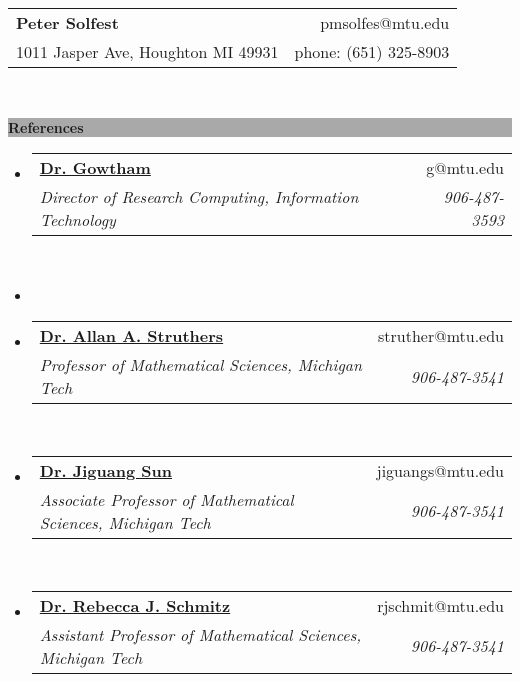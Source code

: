 \documentclass[letterpaper,11pt]{article}
\makeatletter
\newcommand{\resheading}[1]{{\large \colorbox{darkGrey}{\color{white}\begin{minipage}{\textwidth}{\textbf{#1 \vphantom{p\^{E}}}}\end{minipage}}}}
\newcommand{\ressubheading}[4]{
\begin{tabular*}{6.5in}{l@{\extracolsep{\fill}}r}
		\textbf{#1} & #2 \\
		\textit{#3} & \textit{#4} \\
\end{tabular*}\vspace{-6pt}}
\makeatother
\begin{document}
\newcommand{\mywebheader}{
\begin{tabular*}{7in}{l@{\extracolsep{\fill}}r}
	\textbf{\LARGE Peter Solfest} & pmsolfes@mtu.edu\\
	{\footnotesize 1011 Jasper Ave, Houghton MI 49931} & phone: (651) 325-8903 \\
	\end{tabular*}
\\
\vspace{0.1in}}

\mywebheader

\resheading{References}
	\begin{itemize}
		\item
			\ressubheading{\href{http://www.mtu.edu/data-science/graduate/faculty/gowtham/}{Dr. Gowtham}}{g@mtu.edu}{Director of Research Computing, Information Technology}{906-487-3593}\\[1cm]
			
		\item
		\item
			\ressubheading{\href{http://www.mtu.edu/math/department/faculty/struthers/}{Dr. Allan A. Struthers}}{struther@mtu.edu}{Professor of Mathematical Sciences, Michigan Tech}{906-487-3541}\\[1cm]
			
		\item
\ressubheading{\href{http://www.mtu.edu/math/department/faculty/sun-jiguang/}{Dr. Jiguang Sun}}{jiguangs@mtu.edu}{Associate Professor of Mathematical Sciences, Michigan Tech}{906-487-3541}\\[1cm]

		\item
\ressubheading{\href{http://www.mtu.edu/math/department/faculty/schmitz/}{Dr. Rebecca J. Schmitz}}{rjschmit@mtu.edu}{Assistant Professor of Mathematical Sciences, Michigan Tech}{906-487-3541}
				
	\end{itemize}
\end{document}
